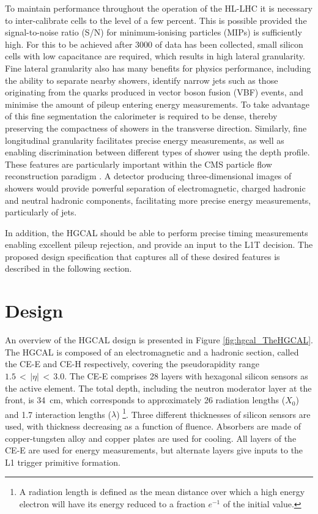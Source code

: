 To maintain performance throughout the operation of the HL-LHC it is necessary 
to inter-calibrate cells to the level of a few percent.
This is possible provided the signal-to-noise ratio (S/N) 
for minimum-ionising particles (MIPs) is sufficiently high.
For this to be achieved after \SI{3000}{\fbinv} of data has been collected, 
small silicon cells with low capacitance are required, which results in high lateral granularity.
Fine lateral granularity also has many benefits for physics performance, 
including the ability to separate nearby showers, identify narrow jets 
such as those originating from the quarks produced in vector boson fusion (VBF) events, 
and minimise the amount of pileup entering energy measurements.
To take advantage of this fine segmentation the calorimeter is required to be dense, 
thereby preserving the compactness of showers in the transverse direction.
Similarly, fine longitudinal granularity facilitates precise energy measurements, 
as well as enabling discrimination between different types of shower using the depth profile.
These features are particularly important 
within the CMS particle flow reconstruction paradigm \cite{ParticleFlow}.
A detector producing three-dimensional images of showers would provide 
powerful separation of electromagnetic, charged hadronic and neutral hadronic components,
facilitating more precise energy measurements, particularly of jets.

In addition, the HGCAL should be able to perform precise timing measurements 
enabling excellent pileup rejection, and provide an input to the L1T decision.
The proposed design specification that captures all of these desired features 
is described in the following section.

\section{Design}

An overview of the HGCAL design is presented in Figure \ref{fig:hgcal_TheHGCAL}.
The HGCAL is composed of an electromagnetic and a hadronic section, called the CE-E and CE-H respectively, covering the pseudorapidity range $1.5\,<\,|\eta|\,<\,3.0$.
The CE-E comprises 28 layers with hexagonal silicon sensors as the active element.
The total depth, including the neutron moderator layer at the front, is \SI{34}{cm}, 
which corresponds to approximately 26 radiation lengths ($X_0$) 
and 1.7 interaction lengths ($\lambda$)
\footnote{A radiation length is defined as the mean distance over which 
a high energy electron will have its energy reduced to a fraction $e^{-1}$ of the initial value.}.
Three different thicknesses of silicon sensors are used, with thickness decreasing as a function of fluence.
Absorbers are made of copper-tungsten alloy and copper plates are used for cooling.
All layers of the CE-E are used for energy measurements, but alternate layers give inputs to the L1 trigger primitive formation. %

